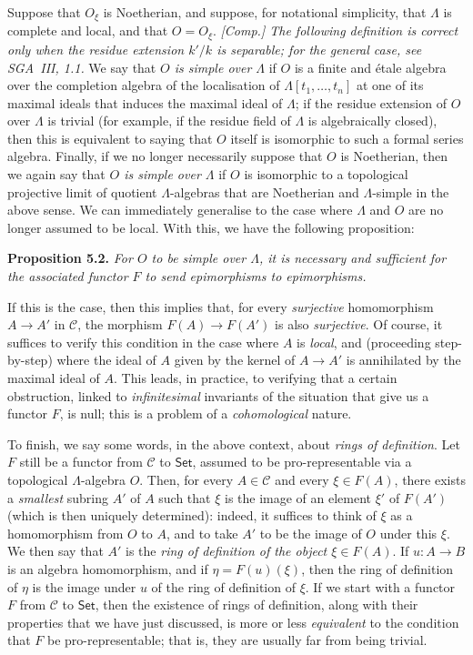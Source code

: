 \documentclass{article}
\newenvironment{itenv}[1]
  {\par\medskip\noindent\textbf{#1.}\itshape}
  {\medskip}
\renewcommand{\cal}[1]{{\mathcal{#1}}}
\newcommand{\Set}{\mathsf{Set}}
\newcommand{\oldpage}[1]{\marginpar{\footnotesize$\Big\vert$ \textit{p.~#1}}}
\begin{document}
Suppose that $O_\xi$ is Noetherian, and suppose, for notational simplicity, that $\Lambda$ is complete and local, and that $O=O_\xi$.
\emph{[Comp.] The following definition is correct only when the residue extension $k'/k$ is \emph{separable}; for the general case, see SGA~III, 1.1.}
We say that \emph{$O$ is simple over $\Lambda$} if $O$ is a finite and \'{e}tale algebra over the completion algebra of the localisation of $\Lambda[t_1,\ldots,t_n]$ at one of its maximal ideals that induces the maximal ideal of $\Lambda$;
if the residue extension of $O$ over $\Lambda$ is trivial (for example, if the residue field of $\Lambda$ is algebraically closed), then this is equivalent to saying that $O$ itself is isomorphic to such a formal series algebra.
Finally, if we no longer necessarily suppose that $O$ is Noetherian, then we again say that \emph{$O$ is simple over $\Lambda$} if $O$ is isomorphic to a topological projective limit of quotient $\Lambda$-algebras that are Noetherian and $\Lambda$-simple in the above sense.
We can immediately generalise to the case where $\Lambda$ and $O$ are no longer assumed to be local.
With this, we have the following proposition:

\begin{itenv}{Proposition 5.2}
\label{A.5-proposition2}
  For $O$ to be simple over $\Lambda$, it is necessary and sufficient for the associated functor $F$ to send epimorphisms to epimorphisms.
\end{itenv}

If this is the case, then this implies that, for every \emph{surjective} homomorphism $A\to A'$ in $\cal{C}$, the morphism $F(A)\to F(A')$ is also \emph{surjective}.
Of course, it suffices to verify this condition in the case where $A$ is \emph{local}, and (proceeding step-by-step) where the ideal of $A$ given by the kernel of $A\to A'$ is annihilated by the maximal ideal of $A$.
This leads, in practice, to verifying that a certain obstruction, linked to \emph{infinitesimal} invariants
\oldpage{195-09}
of the situation that give us a functor $F$, is null;
this is a problem of a \emph{cohomological} nature.

To finish, we say some words, in the above context, about \emph{rings of definition}.
Let $F$ still be a functor from $\cal{C}$ to $\Set$, assumed to be pro-representable via a topological $\Lambda$-algebra $O$.
Then, for every $A\in\cal{C}$ and every $\xi\in F(A)$, there exists a \emph{smallest} subring $A'$ of $A$ such that $\xi$ is the image of an element $\xi'$ of $F(A')$ (which is then uniquely determined):
indeed, it suffices to think of $\xi$ as a homomorphism from $O$ to $A$, and to take $A'$ to be the image of $O$ under this $\xi$.
We then say that $A'$ is the \emph{ring of definition of the object $\xi\in F(A)$}.
If $u\colon A\to B$ is an algebra homomorphism, and if $\eta=F(u)(\xi)$, then the ring of definition of $\eta$ is the image under $u$ of the ring of definition of $\xi$.
If we start with a functor $F$ from $\cal{C}$ to $\Set$, then the existence of rings of definition, along with their properties that we have just discussed, is more or less \emph{equivalent} to the condition that $F$ be pro-representable;
that is, they are usually far from being trivial.
\end{document}
